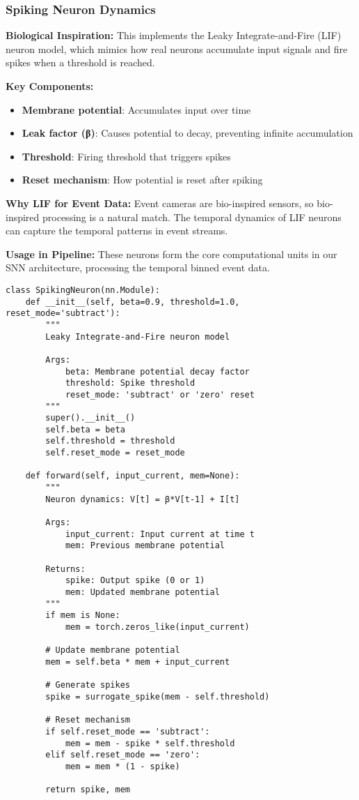 \documentclass[12pt,a4paper]{article}
\begin{document}
\subsubsection{Spiking Neuron Dynamics}

\textbf{Biological Inspiration:} This implements the Leaky Integrate-and-Fire (LIF) neuron model, which mimics how real neurons accumulate input signals and fire spikes when a threshold is reached.

\textbf{Key Components:}
\begin{itemize}
    \item \textbf{Membrane potential}: Accumulates input over time
    \item \textbf{Leak factor (β)}: Causes potential to decay, preventing infinite accumulation
    \item \textbf{Threshold}: Firing threshold that triggers spikes
    \item \textbf{Reset mechanism}: How potential is reset after spiking
\end{itemize}

\textbf{Why LIF for Event Data:} Event cameras are bio-inspired sensors, so bio-inspired processing is a natural match. The temporal dynamics of LIF neurons can capture the temporal patterns in event streams.

\textbf{Usage in Pipeline:} These neurons form the core computational units in our SNN architecture, processing the temporal binned event data.

\begin{lstlisting}[caption={Spiking Neuron Implementation - LIF Neuron Dynamics}]
class SpikingNeuron(nn.Module):
    def __init__(self, beta=0.9, threshold=1.0, reset_mode='subtract'):
        """
        Leaky Integrate-and-Fire neuron model

        Args:
            beta: Membrane potential decay factor
            threshold: Spike threshold
            reset_mode: 'subtract' or 'zero' reset
        """
        super().__init__()
        self.beta = beta
        self.threshold = threshold
        self.reset_mode = reset_mode

    def forward(self, input_current, mem=None):
        """
        Neuron dynamics: V[t] = β*V[t-1] + I[t]

        Args:
            input_current: Input current at time t
            mem: Previous membrane potential

        Returns:
            spike: Output spike (0 or 1)
            mem: Updated membrane potential
        """
        if mem is None:
            mem = torch.zeros_like(input_current)

        # Update membrane potential
        mem = self.beta * mem + input_current

        # Generate spikes
        spike = surrogate_spike(mem - self.threshold)

        # Reset mechanism
        if self.reset_mode == 'subtract':
            mem = mem - spike * self.threshold
        elif self.reset_mode == 'zero':
            mem = mem * (1 - spike)

        return spike, mem
\end{lstlisting}
\end{document}
